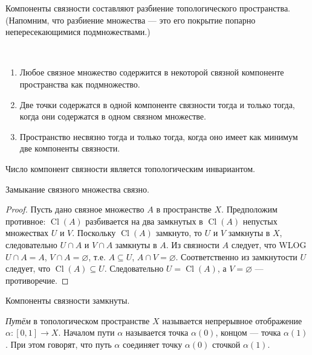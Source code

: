 \documentclass[12pt,a4paper]{article}
\DeclareMathOperator{\Cl}{Cl}
\begin{document}
    \begin{corollary}
        Компоненты связности составляют разбиение топологического пространства. (Напомним, что разбиение множества --- это его покрытие попарно непересекающимися подмножествами.)
    \end{corollary}

    \begin{corollary}\ 
        \begin{enumerate}
            \item Любое связное множество содержится в некоторой связной компоненте пространства как подмножество.
            \item Две точки содержатся в одной компоненте связности тогда и только тогда, когда они содержатся в одном связном множестве.
            \item Пространство несвязно тогда и только тогда, когда оно имеет как минимум две компоненты связности.
        \end{enumerate}
    \end{corollary}

    \begin{corollary}
        Число компонент связности является топологическим инвариантом.
    \end{corollary}

    \begin{theorem}
        Замыкание связного множества связно.
    \end{theorem}

    \begin{proof}
        Пусть дано связное множество $A$ в пространстве $X$. Предположим противное: $\Cl(A)$ разбивается на два замкнутых в $\Cl(A)$ непустых множествах $U$ и $V$. Поскольку $\Cl(A)$ замкнуто, то $U$ и $V$ замкнуты в $X$, следовательно $U \cap A$ и $V \cap A$ замкнуты в $A$. Из связности $A$ следует, что WLOG $U \cap A = A$, $V \cap A = \varnothing$, т.е. $A \subseteq U$, $A \cap V = \varnothing$. Соответственно из замкнутости $U$ следует, что $\Cl(A) \subseteq U$. Следовательно $U = \Cl(A)$, а $V = \varnothing$ --- противоречие.
    \end{proof}

    \begin{corollary}
        Компоненты связности замкнуты.
    \end{corollary}

    \begin{definition}
        \emph{Путём} в топологическом пространстве $X$ называется непрерывное отображение $\alpha: [0,1] \to X$. Началом пути $\alpha$ называется точка $\alpha(0)$, концом --- точка $\alpha(1)$. При этом говорят, что путь $\alpha$ соединяет точку $\alpha(0)$ сточкой $\alpha(1)$.
    \end{definition}
\end{document}
